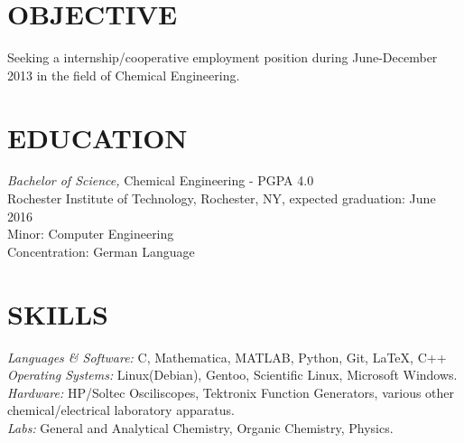 \documentclass[line,margin]{res}
\begin{document}
\address{3241 Nathaniel Rochester Hall, Rochester, NY 14623}
\address{(315) 391-7268 - tmw4661@rit.edu}

\begin{resume}
 
\section{OBJECTIVE}       Seeking a internship/cooperative employment position during June-December
						  2013 in the field of Chemical Engineering.
 
\section{EDUCATION} {\sl Bachelor of Science,} Chemical Engineering - PGPA 4.0 \\
                Rochester Institute of Technology, Rochester, NY, 
                expected graduation: June 2016 \\
                Minor: Computer Engineering \\
                Concentration: German Language \\
\section{SKILLS} {\sl Languages \& Software:} C, Mathematica,
						MATLAB, Python, Git, \LaTeX, C++\\
                {\sl Operating Systems:} Linux(Debian), Gentoo, Scientific Linux, Microsoft Windows.
				{\sl Hardware:} HP/Soltec Osciliscopes, Tektronix Function Generators, various other chemical/electrical laboratory apparatus.\\
				{\sl Labs:} General and Analytical Chemistry, Organic Chemistry, Physics.


\end{resume}
\end{document}
